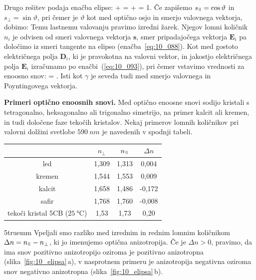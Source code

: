 Drugo rešitev podaja enačba elipse:
\beq
{}+  = 
+  = 
1.
\label{eq:10_104}
\eeq
Če zapišemo $s_\myparallel = \cos \vartheta$ in $s_\perp = \sin \vartheta$, pri čemer je 
$\vartheta$ kot med optično osjo in smerjo valovnega vektorja, dobimo:
Temu lastnemu valovanju pravimo izredni žarek. Njegov lomni količnik $n_i$ je odvisen od 
smeri valovnega vektorja $\mathbf{s}$, smer pripadajočega vektorja $\mathbf{E}_i$
pa določimo iz smeri tangente na elipso (enačba~\ref{eq:10_088}). Kot med gostoto električnega
polja $\mathbf{D}_i$, ki je pravokotna na valovni vektor, in jakostjo električnega polja 
$\mathbf{E}_i$ izračunamo po enačbi~(\ref{eq:10_093}), pri čemer vstavimo vrednosti 
za enoosno snov:
\beq
\cos \gamma = .
\label{eq:10_105}
\eeq
Isti kot $\gamma$ je seveda tudi med smerjo valovnega in Poyntingovega vektorja.

\begin{example}{\bf Primeri optično enoosnih snovi.} Med optično enoosne snovi 
sodijo kristali s tetragonalno, heksagonalno ali trigonalno simetrijo, na primer
kalcit ali kremen, in tudi določene faze tekočih kristalov. 
Nekaj primerov lomnih količnikov pri valovni dolžini svetlobe 
$590~\si{nm}$ je navedenih v spodnji tabeli.
\begin{center}
\begin{tabular}{|c|c|c|c|} \hline
 & $n_\perp$ & $n_\myparallel$ & $\Delta n$\\ \hline
led & 1,309 & 1,313 & 0,004 \\ \hline
kremen & 1,544 & 1,553 & 0,009\\ \hline
kalcit & 1,658 & 1,486 & -0,172\\ \hline
safir & 1,768 & 1,760 & -0,008 \\ \hline
tekoči kristal 5CB ($25~\si{\celsius}$) & 1,53 & 1,73 & 0,20 \\ \hline
\end{tabular}
\end{center}
\vglue5truemm
Vpeljali smo razliko med izrednim in rednim lomnim količnikom
$\Delta n = n_\myparallel - n_\perp$, ki jo imenujemo optična anizotropija. 
Če je $\Delta n >0$, pravimo, da ima snov pozitivno anizotropijo oziroma je 
pozitivno anizotropna (slika~\ref{fig:10_elipsa}\,a), v nasprotnem 
primeru je anizotropija negativna oziroma snov negativno anizotropna
(slika~\ref{fig:10_elipsa}\,b). 
\end{example}

